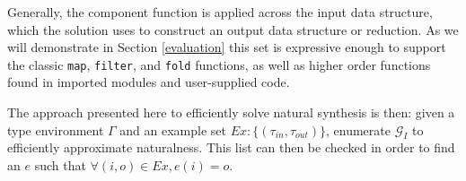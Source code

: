 Generally, the component function is applied across the \textsf{input} data structure, which the \textsf{solution} uses to construct an \textsf{output} data structure or reduction.
As we will demonstrate in Section \ref{evaluation} this set is expressive enough to support the classic \texttt{map}, \texttt{filter}, and \texttt{fold} functions, as well as higher order functions found in imported modules and user-supplied code.

The approach presented here to efficiently solve natural synthesis is then: given a type environment $\Gamma$ and an example set $Ex:\{(\tau_{in},\tau_{out})\}$, enumerate $\mathcal{G}_I$ to efficiently approximate naturalness.
This list can then be checked in order to find an $e$ such that $\forall (i,o) \in Ex, e (i) = o$.
